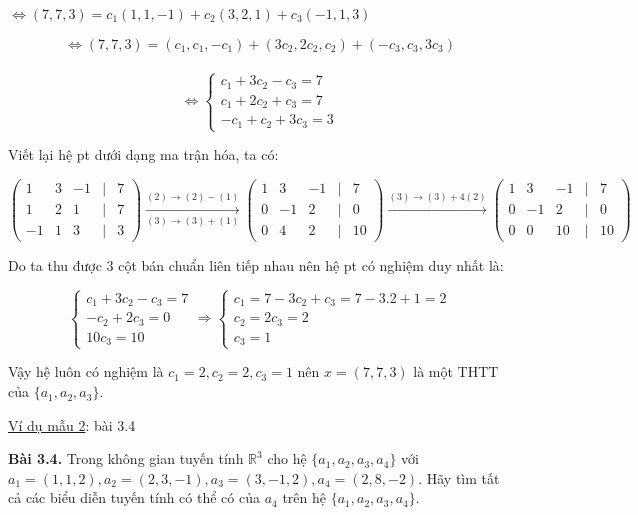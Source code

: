 \documentclass[12pt,a4paper]{article}
\begin{document}
$\Leftrightarrow (7, 7, 3) = c_1(1, 1, -1) + c_2(3, 2, 1) + c_3(-1, 1, 3)$

\[ \Leftrightarrow (7, 7, 3) = (c_1, c_1, -c_1) + (3c_2, 2c_2, c_2) + (-c_3, c_3, 3c_3) \] \\ \[ \Leftrightarrow \begin{cases} c_1 + 3c_2 - c_3 = 7 \\ c_1 + 2c_2 + c_3 = 7 \\ -c_1 + c_2 + 3c_3 = 3 \end{cases} \]

Viết lại hệ pt dưới dạng ma trận hóa, ta có:

\[ \begin{pmatrix} 1 & 3 & -1 & | & 7 \\ 1 & 2 & 1 & | & 7 \\ -1 & 1 & 3 & | & 3 \end{pmatrix} \xrightarrow[(3) \rightarrow (3) + (1)]{(2) \rightarrow (2) - (1)} \begin{pmatrix} 1 & 3 & -1 & | & 7 \\ 0 & -1 & 2 & | & 0 \\ 0 & 4 & 2 & | & 10 \end{pmatrix} \xrightarrow{(3) \rightarrow (3) + 4(2)} \begin{pmatrix} 1 & 3 & -1 & | & 7 \\ 0 & -1 & 2 & | & 0 \\ 0 & 0 & 10 & | & 10 \end{pmatrix} \]

Do ta thu được 3 cột bán chuẩn liên tiếp nhau nên hệ pt có nghiệm duy
nhất là:

\[ \begin{cases} c_1 + 3c_2 - c_3 = 7 \\ -c_2 + 2c_3 = 0 \\ 10c_3 = 10 \end{cases} \Rightarrow \begin{cases} c_1 = 7 - 3c_2 + c_3 = 7 - 3.2 + 1 = 2 \\ c_2 = 2c_3 = 2 \\ c_3 = 1 \end{cases} \]

Vậy hệ luôn có nghiệm là
$c_1 = 2, c_2 = 2, c_3 = 1$ nên
$x = (7, 7, 3)$ là một THTT
của $\{a_1, a_2, a_3\}$.

\ul{Ví dụ mẫu 2}: bài 3.4

\textbf{Bài 3.4.} Trong không gian tuyến tính $\mathbb{R}^3$ cho hệ $\{a_1, a_2, a_3, a_4\}$ với $a_1 = (1, 1, 2), a_2 = (2, 3, -1), a_3 = (3, -1, 2), a_4 = (2, 8, -2)$. Hãy tìm tất cả các biểu diễn tuyến tính có thể có của $a_4$ trên hệ $\{a_1, a_2, a_3, a_4\}$.
\end{document}
